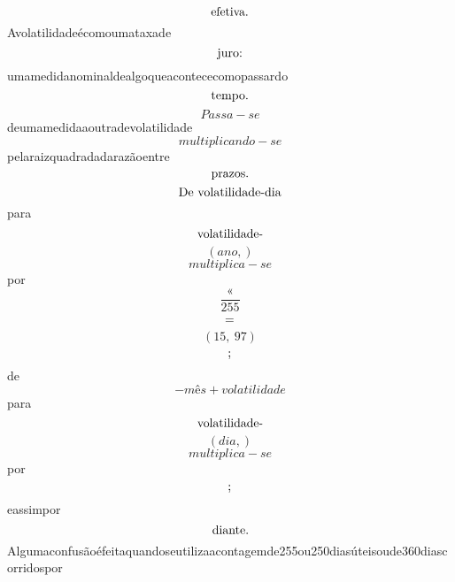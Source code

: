 \documentclass{article}
\begin{document}
\begin{equation}
$efetiva.$
\end{equation}Avolatilidadeécomoumataxade\begin{equation}
$juro:$
\end{equation}umamedidanominaldealgoqueacontececomopassardo\begin{equation}
$tempo.$
\end{equation}\begin{equation}
Passa - se
\end{equation}deumamedidaaoutradevolatilidade\begin{equation}
multiplicando - se
\end{equation}pelaraizquadradadarazãoentre\begin{equation}
$prazos.$
\end{equation}\begin{equation}
$De volatilidade-dia$
\end{equation}para\begin{equation}
$volatilidade-$
\end{equation}\begin{equation}
\left( ano,\right)
\end{equation}\begin{equation}
multiplica - se
\end{equation}por\begin{equation}
\frac{«}{255}
\end{equation}\begin{equation}
$=$
\end{equation}\begin{equation}
\left( 15, \  97\right)
\end{equation}\begin{equation}
$;$
\end{equation}de\begin{equation}
- mês + volatilidade
\end{equation}para\begin{equation}
$volatilidade-$
\end{equation}\begin{equation}
\left( dia,\right)
\end{equation}\begin{equation}
multiplica - se
\end{equation}por\begin{equation}
$;$
\end{equation}eassimpor\begin{equation}
$diante.$
\end{equation}Algumaconfusãoéfeitaquandoseutilizaacontagemde255ou250diasúteisoude360diascorridospor\begin{equation}

\end{equation}
\end{document}
